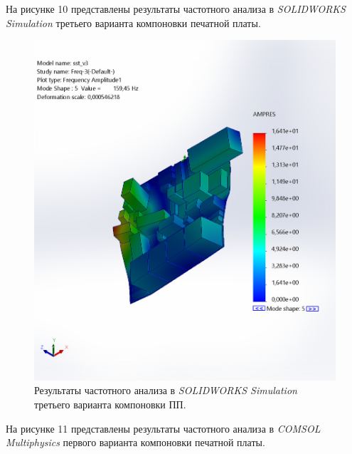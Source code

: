 На рисунке 10 представлены результаты частотного анализа в
\textit{SOLIDWORKS Simulation} третьего варианта компоновки печатной платы.


\begin{figure}[h]
  \centering
\includegraphics[scale=0.3]{../img/sst-3/freq/sst_v3-Freq-3-Amplitude-Amplitude1.jpg}
\caption{Результаты частотного анализа в \textit{SOLIDWORKS Simulation} третьего варианта компоновки ПП.}
\end{figure}

На рисунке 11 представлены результаты частотного анализа в
\textit{COMSOL Multiphysics} первого варианта компоновки печатной платы.

